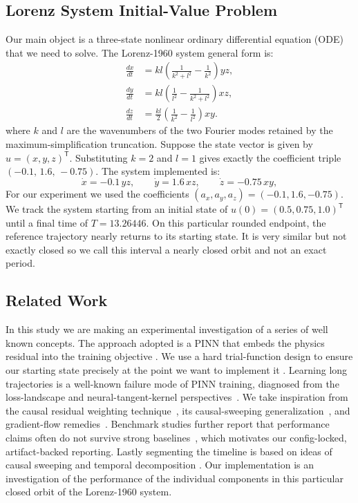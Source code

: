 \documentclass[conference]{IEEEtran}
\begin{document}
\subsection{Lorenz System Initial-Value Problem}
Our main object is a three-state nonlinear ordinary differential equation (ODE) that we need to solve. The Lorenz-1960 system general form \cite{matthews2024pinnde} is:
\begin{equation}
\begin{aligned}
\frac{dx}{dt} &= kl\left(\frac{1}{k^2 + l^2} - \frac{1}{k^2}\right) yz,\\
\frac{dy}{dt} &= kl\left(\frac{1}{l^2} - \frac{1}{k^2 + l^2}\right) xz,\\
\frac{dz}{dt} &= \frac{kl}{2}\left(\frac{1}{k^2} - \frac{1}{l^2}\right) xy.
\end{aligned}
\label{eq:lorenz1960}
\end{equation}
where $k$ and $l$ are the wavenumbers of the two Fourier modes retained by the maximum-simplification truncation. Suppose the state vector is given by $u=(x,y,z)^\mathsf{T}$. Substituting $k=2$ and $l=1$ gives exactly the coefficient triple $(-0.1,\,1.6,\,-0.75)$. The system implemented is:
\begin{equation}
\dot{x}=-0.1\,yz,\qquad \dot{y}=1.6\,xz,\qquad \dot{z}=-0.75\,xy,
\label{eq:ode}
\end{equation}
For our experiment we used the coefficients $(a_x,a_y,a_z)=(-0.1,1.6,-0.75)$. We track the system starting from an initial state \cite{matthews2024pinnde} of $u(0)=(0.5,0.75,1.0)^\mathsf{T}$ until a final time of $T=13.26446$. On this particular rounded endpoint, the reference trajectory nearly returns to its starting state. It is very similar but not exactly closed so we call this interval a nearly closed orbit and not an exact period.


\subsection{Related Work}
In this study we are making an experimental investigation of a series of well known concepts. The approach adopted is a PINN that embeds the physics residual into the training objective \cite{raissi2019}. We use a hard trial-function design \cite{lagaris1998} to ensure our starting state precisely at the point we want to implement it . Learning long trajectories is a well-known failure mode of PINN training, diagnosed from the loss-landscape and neural-tangent-kernel perspectives~\cite{krishnapriyan2021,wang2022ntk,rathore2024}. We take inspiration from the causal residual weighting technique~\cite{wang2024causal}, its causal-sweeping generalization~\cite{penwarden2023}, and gradient-flow remedies~\cite{wang2021gradient}. Benchmark studies further report that performance claims often do not survive strong baselines~\cite{hao2024pinnacle,mcgreivy2024}, which motivates our config-locked, artifact-backed reporting. Lastly segmenting the timeline is based on ideas of causal sweeping and temporal decomposition \cite{penwarden2023}. Our implementation is an investigation of the performance of the individual components in this particular closed orbit of the Lorenz-1960 system.
\end{document}
